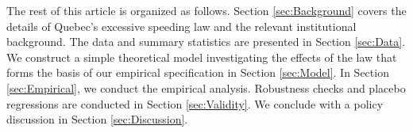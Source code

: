 The rest of this article is organized as follows. 
Section \ref{sec:Background} covers the details of Quebec’s excessive speeding law 
and the relevant institutional background. 
The data and summary statistics are presented in Section \ref{sec:Data}. 
% 
We construct a simple theoretical model investigating the effects of the law
that forms the basis of our empirical specification in Section \ref{sec:Model}. 
% 
In Section \ref{sec:Empirical}, we conduct the empirical analysis. 
Robustness checks and placebo regressions are conducted in Section \ref{sec:Validity}. 
We conclude with a policy discussion in Section \ref{sec:Discussion}.

